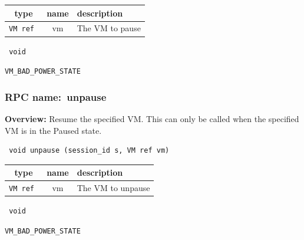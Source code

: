 
 
\vspace{0.3cm}
\begin{tabular}{|c|c|p{7cm}|}
 \hline
{\bf type} & {\bf name} & {\bf description} \\ \hline
{\tt VM ref } & vm & The VM to pause \\ \hline 

\end{tabular}

\vspace{0.3cm}

{\tt 
void
}



\vspace{0.3cm}

 {\tt VM\_BAD\_POWER\_STATE}

\vspace{0.6cm}
\subsubsection{RPC name:~unpause}

{\bf Overview:} 
Resume the specified VM. This can only be called when the specified VM is
in the Paused state.

\begin{verbatim} void unpause (session_id s, VM ref vm)\end{verbatim}



 
\vspace{0.3cm}
\begin{tabular}{|c|c|p{7cm}|}
 \hline
{\bf type} & {\bf name} & {\bf description} \\ \hline
{\tt VM ref } & vm & The VM to unpause \\ \hline 

\end{tabular}

\vspace{0.3cm}

{\tt 
void
}



\vspace{0.3cm}

 {\tt VM\_BAD\_POWER\_STATE}

\vspace{0.6cm}
